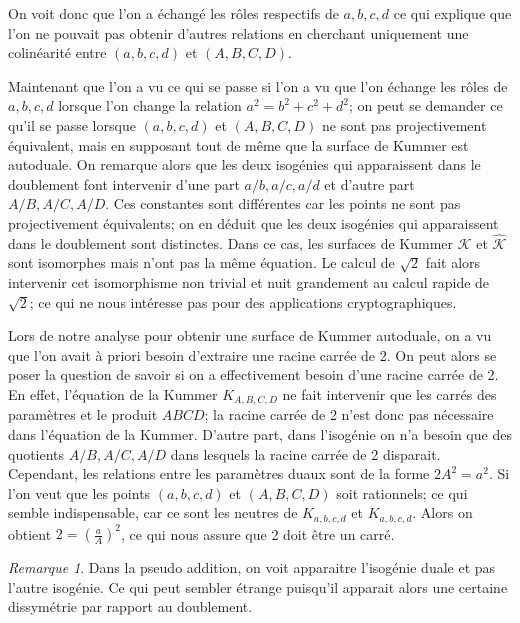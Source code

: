 \documentclass[a4paper]{article}
\theoremstyle{definition}
\theoremstyle{remark}
\newtheorem{remarque}{Remarque}
\numberwithin{equation}{section}
\begin{document}
On voit donc que l'on a échangé les rôles respectifs de $a,b,c,d$ ce qui explique que l'on ne pouvait pas obtenir d'autres relations en cherchant uniquement une colinéarité entre $(a,b,c,d)$ et $(A,B,C,D)$.

Maintenant que l'on a vu ce qui se passe si l'on a vu que l'on échange les rôles de $a,b,c,d$ lorsque l'on change la relation $a^2 = b^2 + c^2 + d^2$; on peut se demander ce qu'il se passe lorsque $(a,b,c,d)$ et $(A,B,C,D)$ ne sont pas projectivement équivalent, mais en supposant tout de même que la surface de Kummer est autoduale. On remarque alors que les deux isogénies qui apparaissent dans le doublement font intervenir d'une part $a/b,a/c,a/d$ et d'autre part $A/B,A/C,A/D$. Ces constantes sont différentes car les points ne sont pas projectivement équivalents; on en déduit que les deux isogénies qui apparaissent dans le doublement sont distinctes.
Dans ce cas, les surfaces de Kummer $\mathcal{K}$ et $\hat{\mathcal{K}}$ sont isomorphes mais n'ont pas la même équation. Le calcul de $\sqrt{2}$ fait alors intervenir cet isomorphisme non trivial et nuit grandement au calcul rapide de $\sqrt{2}$; ce qui ne nous intéresse pas pour des applications cryptographiques.


Lors de notre analyse pour obtenir une surface de Kummer autoduale, on a vu que l'on avait à priori besoin d'extraire une racine carrée de 2. On peut alors se poser la question de savoir si on a effectivement besoin d'une racine carrée de 2. En effet, l'équation de la Kummer $K_{A,B,C,D}$ ne fait intervenir que les carrés des paramètres et le produit $ABCD$; la racine carrée de 2 n'est donc pas nécessaire dans l'équation de la Kummer. D'autre part, dans l'isogénie on n'a besoin que des quotients $A/B,A/C,A/D$ dans lesquels la racine carrée de 2 disparait. Cependant, les relations entre les paramètres duaux sont de la forme $2A^2 = a^2$. Si l'on veut que les points $(a,b,c,d)$ et $(A,B,C,D)$ soit rationnels; ce qui semble indispensable, car ce sont les neutres de $K_{a,b,c,d}$ et $K_{a,b,c,d}$. Alors on obtient $2 = (\frac{a}{A})^2$, ce qui nous assure que 2 doit être un carré.

\begin{remarque}
Dans la pseudo addition, on voit apparaitre l'isogénie duale et pas l'autre isogénie. Ce qui peut sembler étrange puisqu'il apparait alors une certaine dissymétrie par rapport au doublement.
\end{remarque}
\end{document}

